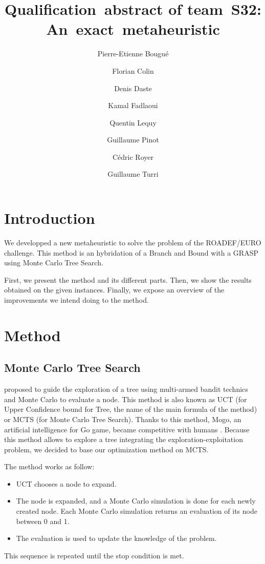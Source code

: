\documentclass[a4paper,twocolumn]{article}
\title{Qualification~abstract of team~S32:
  An~exact~metaheuristic}
\author{Pierre-Etienne Bougué \and Florian Colin \and Denis Daste
  \and Kamal Fadlaoui \and Quentin Lequy \and Guillaume Pinot \and
  Cédric Royer \and Guillaume Turri}
\begin{document}
\maketitle

\section{Introduction}

We developped a new metaheuristic to solve the problem of the
ROADEF/EURO challenge.  This method is an hybridation
of a Branch and Bound with a GRASP using Monte Carlo Tree Search.

First, we present the method and its different parts.  Then, we show
the results obtained on the given instances.  Finally, we expose an
overview of the improvements we intend doing to the method.

\section{Method}

\subsection{Monte Carlo Tree Search}

\cite{kocsis2006bandit} proposed to guide the exploration 
of a tree using multi-armed bandit technics and Monte Carlo to evaluate
a node.  This method is also known as UCT (for Upper Confidence bound
for Tree, the name of the main formula of the method) or MCTS (for
Monte Carlo Tree Search).  Thanks to this method, Mogo, an
artificial intelligence for Go game, became competitive with 
humans \cite{gelly2007contribution}.  Because this method allows to 
explore a tree integrating the exploration-exploitation problem,
we decided to base our optimization method on MCTS.

The method works as follow:
\begin{itemize}
\item UCT chooses a node to expand.
\item The node is expanded, and a Monte Carlo simulation is done for
  each newly created node. Each Monte Carlo simulation returns an
  evaluation of its node between 0 and 1.
\item The evaluation is used to update the
  knowledge of the problem.
\end{itemize}
This sequence is repeated until the stop condition is met.
\end{document}
